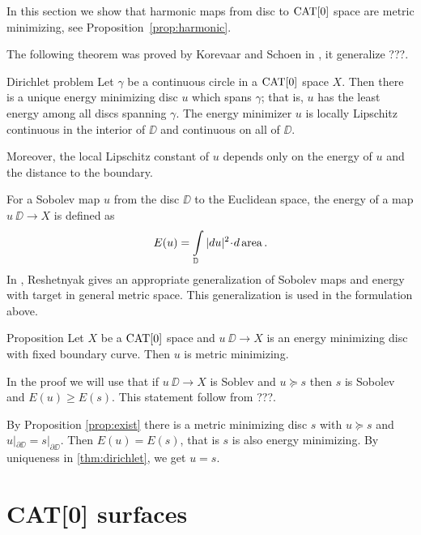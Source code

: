 \documentclass[a4paper,10pt]{amsart}
\begin{document}

In this section we show that harmonic maps from disc to $\mathop{\rm CAT}\nolimits[0]$ space are metric minimizing, see Proposition~\ref{prop:harmonic}.

The following theorem was proved by Korevaar and Schoen in \cite{KS}, it generalize ???.

\begin{thm}{Dirichlet problem}\label{thm:dirichlet}
Let $\gamma$ be a continuous circle in a $\mathop{\rm CAT}\nolimits[0]$ space $X$. 
Then there is a unique energy minimizing disc $u$ which spans $\gamma$; 
that is, $u$
has the least energy among all discs spanning $\gamma$. 
The energy minimizer $u$ is locally Lipschitz continuous in the interior of $\DD$ and continuous on all of $\DD$.

Moreover, the local Lipschitz constant of $u$ depends only on the energy of $u$ and the distance to the boundary.
\end{thm}

For a Sobolev map $u$ from the disc $\DD$ to the Euclidean space, the energy of a map $u\:\DD\to X$ is defined as 
\[E(u)=\int\limits_\DD|du|^2\cdot d\area.\]
In \cite{R}, Reshetnyak gives an appropriate generalization of Sobolev maps and energy with target in general metric space.
This generalization is used in the formulation above.

\begin{thm}{Proposition}\label{prop:harmonic}
Let $X$ be a $\mathop{\rm CAT}\nolimits[0]$ space 
and $u\:\DD\to X$ is an energy minimizing disc with fixed boundary curve.
Then $u$ is metric minimizing.
\end{thm}


In the proof we will use that if $u\:\DD\to X$ is Soblev and 
$u \succcurlyeq s$ then $s$ is Sobolev and $E(u)\ge E(s)$.
This statement follow from ???.

By  Proposition \ref{prop:exist} there is a metric minimizing
disc $s$ with $u \succcurlyeq s$ and $u|_{\partial\DD}=s|_{\partial\DD}$. 
Then $E(u)=E(s)$, that is $s$ is also energy minimizing.
By uniqueness in \ref{thm:dirichlet}, we get $u=s$.
 \qeds
 





\section{CAT[0] surfaces}

 
\end{document}
